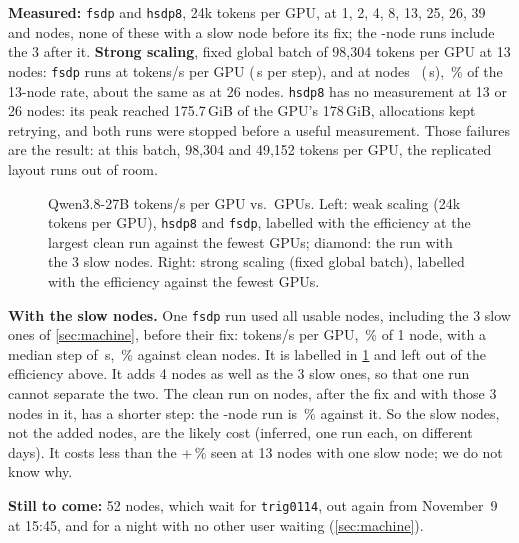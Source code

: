 \textbf{Measured:} \texttt{fsdp} and \texttt{hsdp8}, 24k tokens per GPU, at 1, 2, 4, 8, 13, 25, 26, 39 and \TriWeakTop{} nodes, none of these with a slow node before its fix; the \TriWeakTop-node runs include the 3 after it. \textbf{Strong scaling}, fixed global batch of 98,304 tokens per GPU at 13 nodes: \texttt{fsdp} runs at \TriStrongOne{} tokens/s per GPU (\TriStrongOneStep\,s per step), and at \TriStrongTopNodes{} nodes \TriStrongTop\ (\TriStrongTopStep\,s), \TriStrongEff\,\% of the 13-node rate, about the same as at 26 nodes. \texttt{hsdp8} has no measurement at 13 or 26 nodes: its peak reached 175.7\,GiB of the GPU's 178\,GiB, allocations kept retrying, and both runs were stopped before a useful measurement. Those failures are the result: at this batch, 98,304 and 49,152 tokens per GPU, the replicated layout runs out of room.

\begin{figure}[h]
  \centering{}
  \caption{Qwen3.8-27B tokens/s per GPU vs.\ GPUs. Left: weak scaling (24k tokens per GPU), \texttt{hsdp8} and \texttt{fsdp}, labelled with the efficiency at the largest clean run against the fewest GPUs; diamond: the run with the 3 slow nodes. Right: strong scaling (fixed global batch), labelled with the efficiency against the fewest GPUs. }
  \label{fig:qwen_scaling}
\end{figure}

\textbf{With the slow nodes.} One \texttt{fsdp} run used all \TriSlowRunNodes{} usable nodes, including the 3 slow ones of \cref{sec:machine}, before their fix: \TriSlowRunTok{} tokens/s per GPU, \TriSlowRunEff\,\% of 1 node, with a median step of \TriSlowRunStep\,s, \TriSlowRunPct\,\% against \TriSlowRunRefNodes{} clean nodes. It is labelled in \cref{fig:qwen_scaling} and left out of the efficiency above. It adds 4 nodes as well as the 3 slow ones, so that one run cannot separate the two. The clean run on \TriWeakTop{} nodes, after the fix and with those 3 nodes in it, has a shorter step: the \TriSlowRunNodes-node run is \TriSlowRunVsTopPct\,\% against it. So the slow nodes, not the added nodes, are the likely cost (inferred, one run each, on different days). It costs less than the +\TriSlowThirteenPct\,\% seen at 13 nodes with one slow node; we do not know why.

\textbf{Still to come:} 52 nodes, which wait for \texttt{trig0114}, out again from November~9 at 15:45, and for a night with no other user waiting (\cref{sec:machine}).

